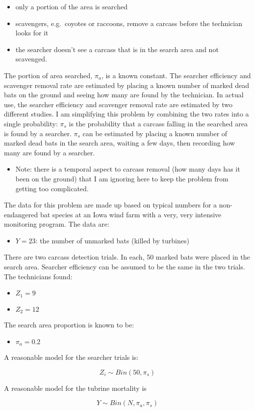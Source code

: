 \documentclass[]{article}
\providecommand{\tightlist}{%
  \setlength{\itemsep}{0pt}\setlength{\parskip}{0pt}}
\begin{document}
\begin{itemize}
\tightlist
\item
  only a portion of the area is searched
\item
  scavengers, e.g.~coyotes or raccoons, remove a carcass before the
  technician looks for it
\item
  the searcher doesn't see a carcass that is in the search area and not
  scavenged.
\end{itemize}

The portion of area searched, \(\pi_a\), is a known constant. The
searcher efficiency and scavenger removal rate are estimated by placing
a known number of marked dead bats on the ground and seeing how many are
found by the technician. In actual use, the searcher efficiency and
scavenger removal rate are estimated by two different studies. I am
simplifying this problem by combining the two rates into a single
probability: \(\pi_s\) is the probability that a carcass falling in the
searched area is found by a searcher. \(\pi_s\) can be estimated by
placing a known number of marked dead bats in the search area, waiting a
few days, then recording how many are found by a searcher.

\begin{itemize}
\tightlist
\item
  Note: there is a temporal aspect to carcass removal (how many days has
  it been on the ground) that I am ignoring here to keep the problem
  from getting too complicated.
\end{itemize}

The data for this problem are made up based on typical numbers for a
non-endangered bat species at an Iowa wind farm with a very, very
intensive monitoring program. The data are:

\begin{itemize}
\tightlist
\item
  \(Y = 23\): the number of unmarked bats (killed by turbines)
\end{itemize}

There are two carcass detection trials. In each, 50 marked bats were
placed in the search area. Searcher efficiency can be assumed to be the
same in the two trials. The technicians found:

\begin{itemize}
\tightlist
\item
  \(Z_1 = 9\)
\item
  \(Z_2 = 12\)
\end{itemize}

The search area proportion is known to be:

\begin{itemize}
\tightlist
\item
  \(\pi_a = 0.2\)
\end{itemize}

A reasonable model for the searcher trials is:

\[
Z_i \sim Bin(50, \pi_s)
\]

A reasonable model for the tubrine mortality is

\[
Y \sim Bin(N, \pi_a, \pi_s)
\]
\end{document}
